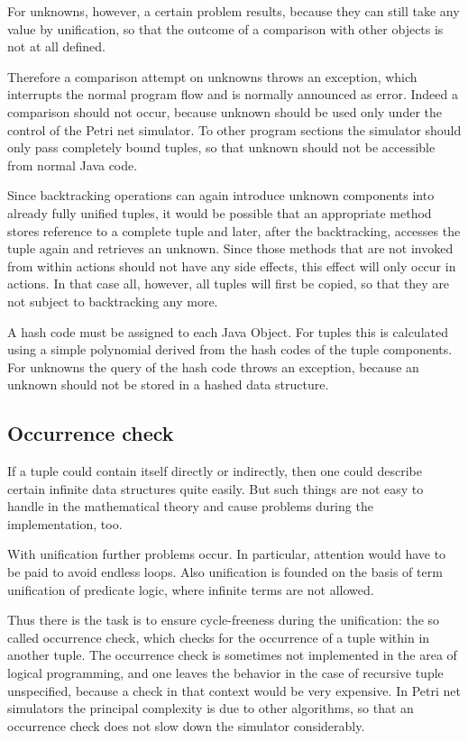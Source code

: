 For unknowns, however, a certain problem results, because they can still  
take any value by unification, so that the outcome of a comparison with  
other objects is not at all defined. 

Therefore a comparison attempt on unknowns throws an exception, 
which interrupts the normal program flow and is normally announced as error. 
Indeed a comparison should not occur, because unknown should be used only 
under the control of the Petri net simulator. To other program sections
the simulator should only pass completely bound tuples, 
so that unknown should not be accessible from normal Java code. 

Since backtracking operations can again introduce unknown components into 
already fully unified tuples, it would be possible that an appropriate  
method stores reference to a complete tuple and later, after the  
backtracking, accesses the tuple again and retrieves an unknown. Since  
those methods that are not invoked from within actions 
should not have any side effects, this effect will only  
occur in actions. In that case all, however, all tuples will first be  
copied, so that they are not subject to backtracking any more. 

A hash code must be assigned to each Java Object. For tuples this 
is calculated using a simple polynomial derived from the hash codes of 
the tuple components. For unknowns the query of the hash code throws
an exception, because an unknown should not be stored in a hashed 
data structure. 


\subsection{Occurrence check}

If a tuple could contain itself directly or indirectly, then one could 
describe certain infinite data structures quite easily. But such things 
are not easy to handle in the mathematical theory and cause problems 
during the implementation, too.

With unification further problems occur. In particular,
attention would have to be paid to avoid endless loops. Also unification 
is founded on the basis of term unification of predicate 
logic, where infinite terms are not allowed. 
 
Thus there is the task is to ensure cycle-freeness during the 
unification: the so called occurrence check, which checks for the 
occurrence of a tuple within in another tuple. The 
occurrence check is sometimes not implemented in the area of 
logical programming, and one leaves the behavior in the case 
of recursive tuple unspecified, because a check in 
that context would be very expensive. In Petri net simulators 
the principal complexity is due to other algorithms, so 
that an occurrence check does not slow down the simulator considerably.



